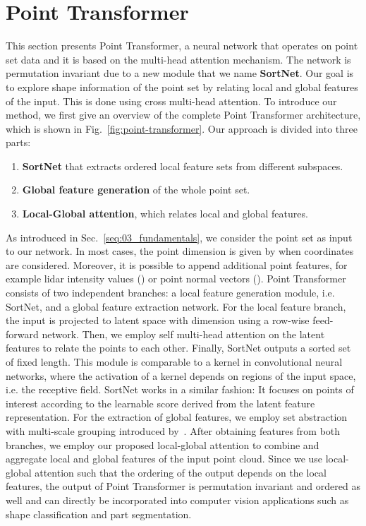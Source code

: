 \documentclass{ieeeaccess}
\begin{document}
\section{Point Transformer}\label{seq:04_transformer}

This section presents Point Transformer, a neural network that operates on point set data and it is based on the multi-head attention mechanism. The network is permutation invariant due to a new module that we name \textbf{SortNet}. Our goal is to explore shape information of the point set by relating local and global features of the input. This is done using cross multi-head attention. To introduce our method, we first give an overview of the complete Point Transformer architecture, which is shown in Fig.~\ref{fig:point-transformer}. Our approach is divided into three parts:

\begin{enumerate}
    \item \textbf{SortNet} that extracts ordered local feature sets from different subspaces.
    \item \textbf{Global feature generation} of the whole point set.
    \item \textbf{Local-Global attention}, which relates local and global features.
\end{enumerate}

As introduced in Sec.~\ref{seq:03_fundamentals}, we consider the point set \mbox{} as input to our network. In most cases, the point dimension is given by  when  coordinates are considered. Moreover, it is possible to append additional point features, for example lidar intensity values () or point normal vectors (). Point Transformer consists of two independent branches: a local feature generation module, i.e. SortNet, and a global feature extraction network. For the local feature branch, the input  is projected to latent space with dimension  using a row-wise feed-forward network. Then, we employ self multi-head attention on the latent features to relate the points to each other. Finally, SortNet outputs a sorted set of fixed length. This module is comparable to a kernel in convolutional neural networks, where the activation of a kernel depends on regions of the input space, i.e. the receptive field. SortNet works in a similar fashion: It focuses on points of interest according to the learnable score derived from the latent feature representation. For the extraction of global features, we employ set abstraction with multi-scale grouping introduced by~\cite{qi2017pointnet++}.
After obtaining features from both branches, we employ our proposed local-global attention to combine and aggregate local and global features of the input point cloud.
Since we use local-global attention such that the ordering of the output depends on the local features, the output of Point Transformer is permutation invariant and ordered as well and can directly be incorporated into computer vision applications such as shape classification and part segmentation.
\end{document}

